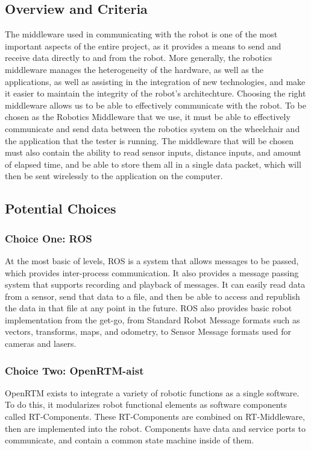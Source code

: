 \documentclass[onecolumn, draftclsnofoot,10pt, compsoc]{report}
\begin{document}
\subsection{Overview and Criteria}
The middleware used in communicating with the robot is one of the most important aspects of the entire project, as it provides a means to send and receive data directly to and from the robot. More generally, the robotics middleware manages the heterogeneity of the hardware, as well as the applications, as well as assisting in the integration of new technologies, and make it easier to maintain the integrity of the robot's architechture.\cite{Robotics_Middleware} Choosing the right middleware allows us to be able to effectively communicate with the robot. To be chosen as the Robotics Middleware that we use, it must be able to effectively communicate and send data between the robotics system on the wheelchair and the application that the tester is running. The middleware that will be chosen must also contain the ability to read sensor inputs, distance inputs, and amount of elapsed time, and be able to store them all in a single data packet, which will then be sent wirelessly to the application on the computer.

\subsection{Potential Choices}

\subsubsection{Choice One: ROS}
At the most basic of levels, ROS is a system that allows messages to be passed, which provides inter-process communication. It also provides a message passing system that supports recording and playback of messages. It can easily read data from a sensor, send that data to a file, and then be able to access and republish the data in that file at any point in the future. ROS also provides basic robot implementation from the get-go, from Standard Robot Message formats such as vectors, transforms, maps, and odometry, to Sensor Message formats used for cameras and lasers.\cite{ROS_Core}

\subsubsection{Choice Two: OpenRTM-aist}
OpenRTM exists to integrate a variety of robotic functions as a single software. To do this, it modularizes robot functional elements as software components called RT-Components. These RT-Components are combined on RT-Middleware, then are implemented into the robot. Components have data and service ports to communicate, and contain a common state machine inside of them.\cite{OpenRTM_Info}
\end{document}
